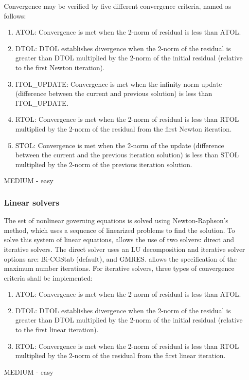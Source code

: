 Convergence may be verified by five different convergence criteria, named as follows:
\begin{enumerate}[resume]
	\item ATOL: \label{nonlinearATOL} Convergence is met when the 2-norm of residual is less than ATOL.
	\item DTOL:\label{nonlinearDTOL} DTOL establishes divergence when the 2-norm of the residual is greater than DTOL multiplied by the 2-norm of the initial residual (relative to the first Newton iteration).
	\item ITOL\_UPDATE:\label{nonlinearITOL} Convergence is met when the infinity norm update (difference between the current and previous solution) is less than ITOL\_UPDATE.
	\item RTOL:\label{nonlinearRTOL} Convergence is met when the 2-norm of residual is less than RTOL multiplied by the 2-norm of the residual from the first Newton iteration.
	\item STOL:\label{nonlinearSTOL} Convergence is met when the 2-norm of the update (difference between the current and the previous iteration solution) is less than STOL multiplied by the 2-norm of the previous iteration solution.
\end{enumerate}
MEDIUM - easy

\subsubsection{Linear solvers}
The set of nonlinear governing equations is solved using Newton-Raphson’s method, which uses a sequence of linearized problems to find the solution. To solve this system of linear equations, \pft allows the use of two solvers: direct and iterative solvers. The direct solver uses an LU decomposition and iterative solver options are: Bi-CGStab (default), and GMRES. \pft allows the specification of the maximum number iterations. 
For iterative solvers, three types of convergence criteria shall be implemented:
\begin{enumerate}[resume]
	\item ATOL: \label{linearATOL} Convergence is met when the 2-norm of residual is less than ATOL.
	\item DTOL:\label{linearDTOL} DTOL establishes divergence when the 2-norm of the residual is greater than DTOL multiplied by the 2-norm of the initial residual (relative to the first linear iteration).
	\item RTOL:\label{linearRTOL} Convergence is met when the 2-norm of residual is less than RTOL multiplied by the 2-norm of the residual from the first linear iteration.
\end{enumerate}
MEDIUM - easy

